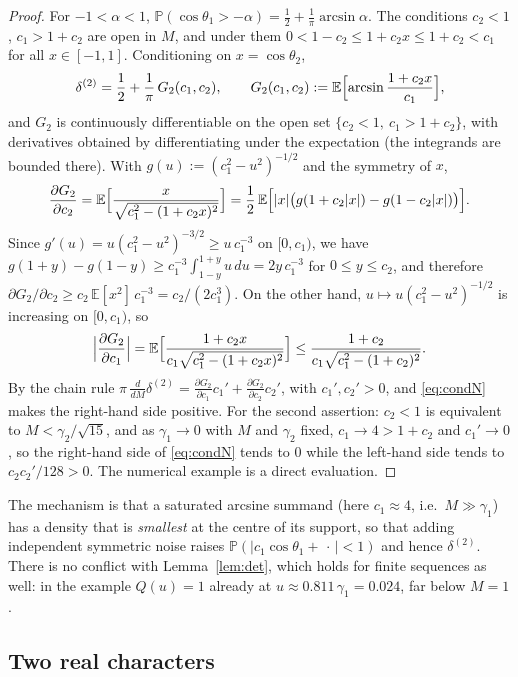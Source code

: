 \documentclass[11pt]{amsart}
\theoremstyle{definition}
\numberwithin{equation}{section}
\newcommand{\PP}{\mathbb P}
\newcommand{\EE}{\mathbb E}
\begin{document}
\begin{proof}
For $-1<\alpha<1$, $\PP(\cos\theta_1>-\alpha)=\tfrac12+\tfrac1\pi\arcsin\alpha$.
The conditions $c_2<1$, $c_1>1+c_2$ are open in $M$, and under them
$0<1-c_2\le1+c_2x\le1+c_2<c_1$ for all $x\in[-1,1]$. Conditioning on
$x=\cos\theta_2$,
\[
\delta^{(2)}=\frac12+\frac1\pi\,G_2(c_1,c_2),\qquad
G_2(c_1,c_2):=\EE\Bigl[\arcsin\frac{1+c_2x}{c_1}\Bigr],
\]
and $G_2$ is continuously differentiable on the open set
$\{c_2<1,\ c_1>1+c_2\}$, with derivatives obtained by differentiating
under the expectation (the integrands are bounded there). With
$g(u):=(c_1^2-u^2)^{-1/2}$ and the symmetry of $x$,
\[
\frac{\partial G_2}{\partial c_2}
=\EE\Bigl[\frac{x}{\sqrt{c_1^2-(1+c_2x)^2}}\Bigr]
=\frac12\,\EE\Bigl[|x|\bigl(g(1+c_2|x|)-g(1-c_2|x|)\bigr)\Bigr].
\]
Since $g'(u)=u(c_1^2-u^2)^{-3/2}\ge u\,c_1^{-3}$ on $[0,c_1)$, we have
$g(1+y)-g(1-y)\ge c_1^{-3}\int_{1-y}^{1+y}u\,du=2y\,c_1^{-3}$ for
$0\le y\le c_2$, and therefore
$\partial G_2/\partial c_2\ge c_2\,\EE[x^2]\,c_1^{-3}=c_2/(2c_1^3)$. On
the other hand, $u\mapsto u(c_1^2-u^2)^{-1/2}$ is increasing on
$[0,c_1)$, so
\[
\Bigl|\frac{\partial G_2}{\partial c_1}\Bigr|
=\EE\Bigl[\frac{1+c_2x}{c_1\sqrt{c_1^2-(1+c_2x)^2}}\Bigr]
\le\frac{1+c_2}{c_1\sqrt{c_1^2-(1+c_2)^2}} .
\]
By the chain rule
$\pi\,\frac{d}{dM}\delta^{(2)}=\frac{\partial G_2}{\partial c_1}c_1'
+\frac{\partial G_2}{\partial c_2}c_2'$, with $c_1',c_2'>0$, and
\eqref{eq:condN} makes the right-hand side positive. For the second
assertion: $c_2<1$ is equivalent to $M<\gamma_2/\sqrt{15}$, and as
$\gamma_1\to0$ with $M$ and $\gamma_2$ fixed, $c_1\to4>1+c_2$ and
$c_1'\to0$, so the right-hand side of \eqref{eq:condN} tends to $0$
while the left-hand side tends to $c_2c_2'/128>0$. The numerical
example is a direct evaluation.
\end{proof}

The mechanism is that a saturated arcsine summand (here $c_1\approx4$,
i.e.\ $M\gg\gamma_1$) has a density that is \emph{smallest} at the
centre of its support, so that adding independent symmetric noise
raises $\PP(|c_1\cos\theta_1+\,\cdot\,|<1)$ and hence $\delta^{(2)}$.
There is no conflict with Lemma~\ref{lem:det}, which holds for finite
sequences as well: in the example $Q(u)=1$ already at
$u\approx0.811\,\gamma_1=0.024$, far below $M=1$.

\subsection{Two real characters}
\end{document}
